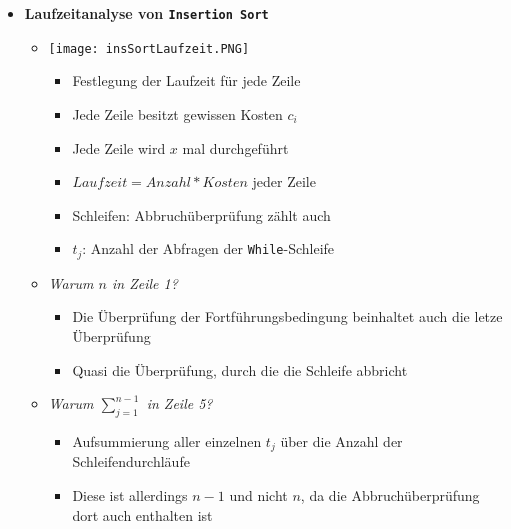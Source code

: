 \begin{itemize}
        \item \textbf{Laufzeitanalyse von \texttt{Insertion Sort}} {\label{insSortLaufzeit}}
            \begin{itemize}
                \item[] 
                    \begin{minipage}{0.45\textwidth}
                    \texttt{[image: insSortLaufzeit.PNG]}
                    \end{minipage}
                    \begin{minipage}[t]{0.45\textwidth}
                    \vspace{-2.5cm}
                    \begin{itemize}
                        \item Festlegung der Laufzeit für jede Zeile
                        \item Jede Zeile besitzt gewissen Kosten \texttt{$c_i$}
                        \item Jede Zeile wird $x$ mal durchgeführt 
                        \item $Laufzeit = Anzahl * Kosten$ jeder Zeile
                        \item Schleifen: Abbruchüberprüfung zählt auch
                        \item \texttt{$t_j$}: Anzahl der Abfragen der \texttt{While}-Schleife
                    \end{itemize}
                    \end{minipage}

                \item \textit{Warum $n$ in Zeile 1?}
                    \begin{itemize}
                        \item Die Überprüfung der Fortführungsbedingung beinhaltet auch die letze Überprüfung 
                        \item Quasi die Überprüfung, durch die die Schleife abbricht
                    \end{itemize}

                \item \textit{Warum $\sum^{n-1}_{j=1}$ in Zeile 5?}
                    \begin{itemize}
                        \item Aufsummierung aller einzelnen $t_j$ über die Anzahl der Schleifendurchläufe
                        \item Diese ist allerdings $n-1$ und nicht $n$, da die Abbruchüberprüfung dort auch enthalten ist
                    \end{itemize}
                

\end{itemize}
\end{itemize}

